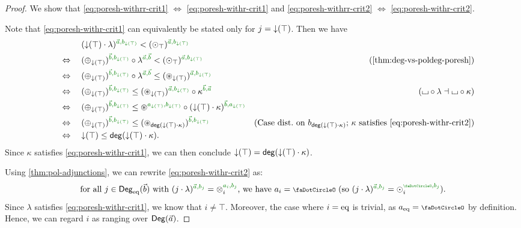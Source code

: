 \documentclass[a4paper]{memoir}
\begin{document}
\begin{proof}
	We show that \cref{eq:poresh-withrr-crit1} $\Leftrightarrow$ \cref{eq:poresh-withr-crit1} and \cref{eq:poresh-withrr-crit2} $\Leftrightarrow$ \cref{eq:poresh-withr-crit2}.
	
	Note that \cref{eq:poresh-withr-crit1} can equivalently be stated only for $j = {\downarrow}(\top)$. Then we have
	\begin{align*}
		&\quad\mathrel{\phantom{\Leftrightarrow}}\quad
		(\predeg(\top) \cdot \lambda)\pmrhom{\vec a}{b_{\predeg(\top)}}
		< (\nonpol_\top)\pmrhom{\vec a}{b_{\predeg(\top)}}
		\\ &\quad\Leftrightarrow\quad
		(\pospol_{\predeg(\top)})\pmrhom{\vec b}{b_{\predeg(\top)}} \circ \lambda\pmrhom{\vec a}{\vec b}
		< (\nonpol_\top)\pmrhom{\vec a}{b_{\predeg(\top)}}
		&\text{(\Cref{thm:deg-vs-poldeg-poresh})}
		\\ &\quad\Leftrightarrow\quad
		(\pospol_{\predeg(\top)})\pmrhom{\vec b}{b_{\predeg(\top)}} \circ \lambda\pmrhom{\vec a}{\vec b}
		\leq (\isopol_{\predeg(\top)})\pmrhom{\vec a}{b_{\predeg(\top)}}
		\\ &\quad\Leftrightarrow\quad
		(\pospol_{\predeg(\top)})\pmrhom{\vec b}{b_{\predeg(\top)}}
		\leq (\isopol_{\predeg(\top)})\pmrhom{\vec a}{b_{\predeg(\top)}} \circ \kappa\pmrhom{\vec b}{\vec a}
		&\text{($\loch \circ \lambda \dashv \loch \circ \kappa$)}
		\\ &\quad\Leftrightarrow\quad
		(\pospol_{\predeg(\top)})\pmrhom{\vec b}{b_{\predeg(\top)}}
		\leq \isopol\pmrhom{a_{\predeg(\top)}}{b_{\predeg(\top)}} \circ (\predeg(\top) \cdot \kappa)\pmrhom{\vec b}{a_{\predeg(\top)}}
		\\ &\quad\Leftrightarrow\quad
		(\pospol_{\predeg(\top)})\pmrhom{\vec b}{b_{\predeg(\top)}}
		\leq (\isopol_{\getdeg(\predeg(\top) \cdot \kappa)})\pmrhom{\vec b}{b_{\predeg(\top)}}
		&\text{(Case dist.\ on $b_{\getdeg(\predeg(\top) \cdot \kappa)}$; $\kappa$ satisfies \cref{eq:poresh-withr-crit2})}
		\\ &\quad\Leftrightarrow\quad
		\predeg(\top) \leq \getdeg(\predeg(\top) \cdot \kappa).
	\end{align*}
	Since $\kappa$ satisfies \cref{eq:poresh-withr-crit1}, we can then conclude ${\downarrow}(\top) = \mathsf{deg}({\downarrow}(\top) \cdot \kappa)$.
	
	Using \cref{thm:pol-adjunctions}, we can rewrite \cref{eq:poresh-withr-crit2} as:
	\[
		\text{for all } j \in \Degeq(\vec b) \text{ with } (j \cdot \lambda)\pmrhom{\vec a}{b_j} = \mixpol_i\pmrhom{a_i}{b_j} \text{, we have } a_i = \npolar \text{ (so $(j \cdot \lambda)\pmrhom{\vec a}{b_j} = \nonpol_i\pmrhom{\npolar}{b_j}$)}.
	\]
	Since $\lambda$ satisfies \cref{eq:poresh-withr-crit1}, we know that $i \neq \top$. Moreover, the case where $i = {\mathrm{eq}}$ is trivial, as $a_\eqtydeg = \npolar$ by definition. Hence, we can regard $i$ as ranging over ${\mathsf{Deg}}(\vec a)$.
	

\end{proof}
\end{document}
